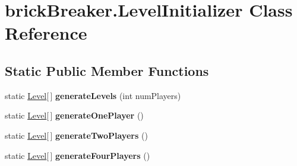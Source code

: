 \hypertarget{classbrick_breaker_1_1_level_initializer}{
\section{brickBreaker.LevelInitializer Class Reference}
\label{classbrick_breaker_1_1_level_initializer}
}
\subsection*{Static Public Member Functions}
\begin{DoxyCompactItemize}
\item 
\hypertarget{classbrick_breaker_1_1_level_initializer_afacc07e5171f482c78534f1d5ac68675}{
static \hyperlink{classbrick_breaker_1_1_level}{Level}\mbox{[}$\,$\mbox{]} {\bfseries generateLevels} (int numPlayers)}
\label{classbrick_breaker_1_1_level_initializer_afacc07e5171f482c78534f1d5ac68675}

\item 
\hypertarget{classbrick_breaker_1_1_level_initializer_ac33a0530b0b29f684b1d0606e93446a2}{
static \hyperlink{classbrick_breaker_1_1_level}{Level}\mbox{[}$\,$\mbox{]} {\bfseries generateOnePlayer} ()}
\label{classbrick_breaker_1_1_level_initializer_ac33a0530b0b29f684b1d0606e93446a2}

\item 
\hypertarget{classbrick_breaker_1_1_level_initializer_a16b18591cd2d4ab4a27aae14f2f3cc14}{
static \hyperlink{classbrick_breaker_1_1_level}{Level}\mbox{[}$\,$\mbox{]} {\bfseries generateTwoPlayers} ()}
\label{classbrick_breaker_1_1_level_initializer_a16b18591cd2d4ab4a27aae14f2f3cc14}

\item 
\hypertarget{classbrick_breaker_1_1_level_initializer_afb5066708c4693653fff665fa9974469}{
static \hyperlink{classbrick_breaker_1_1_level}{Level}\mbox{[}$\,$\mbox{]} {\bfseries generateFourPlayers} ()}
\label{classbrick_breaker_1_1_level_initializer_afb5066708c4693653fff665fa9974469}

\end{DoxyCompactItemize}
